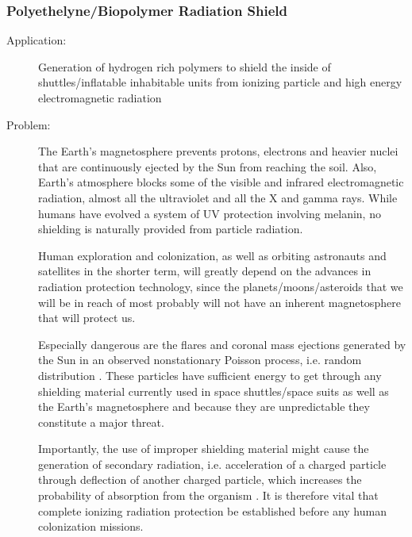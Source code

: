 \subsubsection{Polyethelyne/Biopolymer Radiation Shield} 
\begin{description}  \item[Application:] Generation of hydrogen rich polymers to shield the  inside of shuttles/inflatable inhabitable units from ionizing particle  and high energy electromagnetic radiation
\item[Problem:] 
The Earth’s magnetosphere prevents  protons, electrons and heavier nuclei that are continuously ejected by  the Sun from reaching the soil. Also, Earth's atmosphere blocks some of  the visible and infrared electromagnetic radiation, almost all the  ultraviolet and all the X and gamma rays. While humans have evolved a  system of UV protection involving melanin, no shielding is naturally  provided from particle radiation.

Human  exploration and colonization, as well as orbiting astronauts and  satellites in the shorter term, will greatly depend on the advances in  radiation protection technology, since the planets/moons/asteroids that  we will be in reach of most probably will not have an inherent  magnetosphere that will protect us.

Especially  dangerous are the flares and coronal mass ejections generated by the  Sun in an observed nonstationary Poisson process, i.e. random  distribution \cite{Aschwanden2010}. These particles have  sufficient energy to get through any shielding material currently used  in space shuttles/space suits as well as the Earth's magnetosphere and because they are  unpredictable they constitute a major threat. \cite{solarsystemexplore}

Importantly,  the use of improper shielding material might cause the generation of  secondary radiation, i.e. acceleration of a charged particle through  deflection of another charged particle, which increases the probability  of absorption from the organism \cite{NCRP}.
It is therefore vital that  complete ionizing radiation protection be established before any human  colonization missions. 
 

\end{description}
